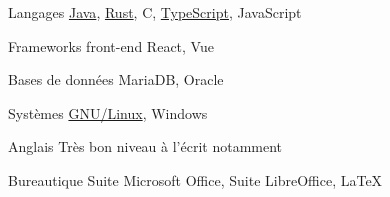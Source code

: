 

\begin{cvskills}

  \cvskill
    {Langages} %
    {\underline{Java}, \underline{Rust}, C, \underline{TypeScript}, JavaScript} %

  \cvskill
    {Frameworks front-end} %
    {React, Vue} %

  \cvskill
    {Bases de données} %
    {MariaDB, Oracle} %

  \cvskill
    {Systèmes} %
    {\underline{GNU/Linux}, Windows} %

  \cvskill
    {Anglais} %
    {Très bon niveau à l'écrit notamment} %

  \cvskill
    {Bureautique} %
    {Suite Microsoft Office, Suite LibreOffice, LaTeX} %

\end{cvskills}
